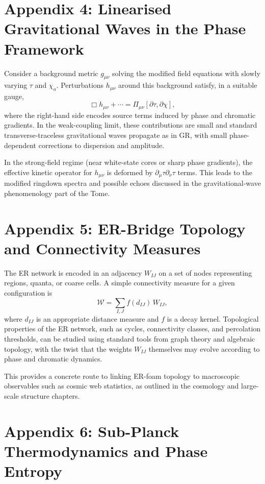 \chapter{Appendix 4: Linearised Gravitational Waves in the Phase Framework}

Consider a background metric \(g_{\mu\nu}\) solving the modified field equations with slowly varying \(\tau\) and \(\chi_a\).
Perturbations \(h_{\mu\nu}\) around this background satisfy, in a suitable gauge,
\[
\Box h_{\mu\nu} + \cdots = \Pi_{\mu\nu}[\partial\tau,\partial\chi],
\]
where the right-hand side encodes source terms induced by phase and chromatic gradients.
In the weak-coupling limit, these contributions are small and standard transverse-traceless gravitational waves propagate as in GR, with small phase-dependent corrections to dispersion and amplitude.

In the strong-field regime (near white-state cores or sharp phase gradients), the effective kinetic operator for \(h_{\mu\nu}\) is deformed by \(\partial_\mu\tau\partial_\nu\tau\) terms.
This leads to the modified ringdown spectra and possible echoes discussed in the gravitational-wave phenomenology part of the Tome.

\chapter{Appendix 5: ER-Bridge Topology and Connectivity Measures}

The ER network is encoded in an adjacency \(W_{IJ}\) on a set of nodes representing regions, quanta, or coarse cells.
A simple connectivity measure for a given configuration is
\[
\mathcal{W} = \sum_{I,J} f(d_{IJ})\,W_{IJ},
\]
where \(d_{IJ}\) is an appropriate distance measure and \(f\) is a decay kernel.
Topological properties of the ER network, such as cycles, connectivity classes, and percolation thresholds, can be studied using standard tools from graph theory and algebraic topology, with the twist that the weights \(W_{IJ}\) themselves may evolve according to phase and chromatic dynamics.

This provides a concrete route to linking ER-foam topology to macroscopic observables such as cosmic web statistics, as outlined in the cosmology and large-scale structure chapters.

\chapter{Appendix 6: Sub-Planck Thermodynamics and Phase Entropy}

